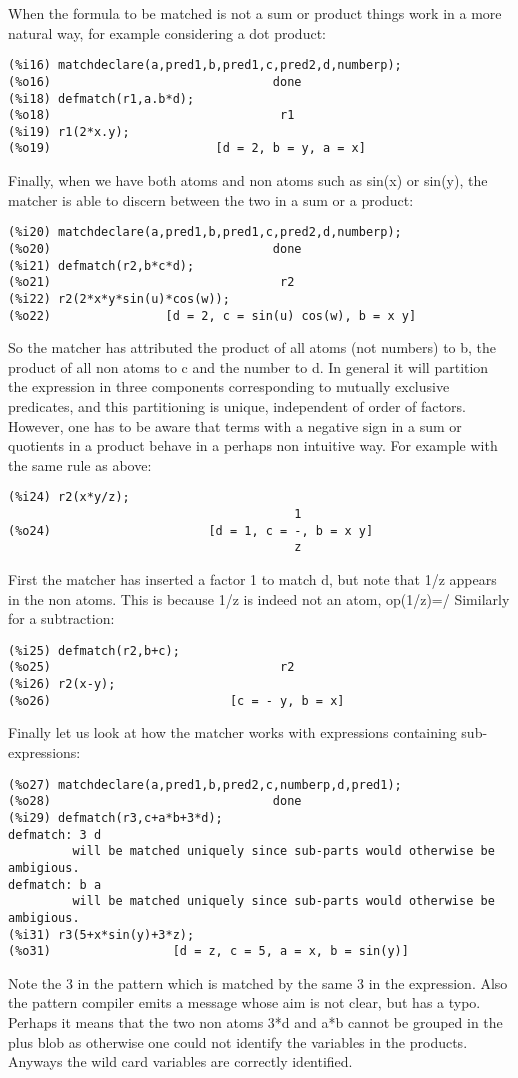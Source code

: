 \documentclass[a4paper,11pt]{article}
\begin{document}
When the formula to be matched is not a
sum or product things work in a more natural way, for example
considering a dot product:
\begin{verbatim}
(%i16) matchdeclare(a,pred1,b,pred1,c,pred2,d,numberp);
(%o16)                               done
(%i18) defmatch(r1,a.b*d);
(%o18)                                r1
(%i19) r1(2*x.y);
(%o19)                       [d = 2, b = y, a = x]
\end{verbatim}

Finally, when we have both atoms and non atoms such as sin(x) or sin(y),
the matcher is able to discern between the two in a sum or a product:
\begin{verbatim}
(%i20) matchdeclare(a,pred1,b,pred1,c,pred2,d,numberp);
(%o20)                               done
(%i21) defmatch(r2,b*c*d);
(%o21)                                r2
(%i22) r2(2*x*y*sin(u)*cos(w));
(%o22)                [d = 2, c = sin(u) cos(w), b = x y]
\end{verbatim}
So the matcher has attributed the product of all atoms (not numbers)
to b, the product of all non atoms to c and the number to d. In general
it will partition the expression in three components corresponding to
mutually exclusive predicates, and this partitioning is unique, 
independent of order of factors. However, one has to be aware that
terms with a negative sign in a sum or quotients in a product behave
in a perhaps non intuitive way. For example with the same rule as above:
\begin{verbatim}
(%i24) r2(x*y/z);
                                        1
(%o24)                      [d = 1, c = -, b = x y]
                                        z
\end{verbatim}
First the matcher has inserted a factor 1 to match d, but note that 1/z
appears in the non atoms. This is because 1/z is indeed not an atom, 
op(1/z)=/ Similarly for a subtraction:
\begin{verbatim}
(%i25) defmatch(r2,b+c);
(%o25)                                r2
(%i26) r2(x-y);
(%o26)                         [c = - y, b = x]
\end{verbatim}
Finally let us look at how the matcher works with expressions
containing sub-expressions:
\begin{verbatim}
(%o27) matchdeclare(a,pred1,b,pred2,c,numberp,d,pred1);
(%o28)                               done
(%i29) defmatch(r3,c+a*b+3*d);
defmatch: 3 d
         will be matched uniquely since sub-parts would otherwise be ambigious.
defmatch: b a
         will be matched uniquely since sub-parts would otherwise be ambigious.
(%i31) r3(5+x*sin(y)+3*z);
(%o31)                 [d = z, c = 5, a = x, b = sin(y)]
\end{verbatim}
Note the 3 in the pattern which is matched by the same 3 in the expression. Also
the pattern compiler emits a message whose aim is not clear, but has a typo.
Perhaps it means that the two non atoms 3*d and a*b cannot be grouped in the
plus blob as otherwise one could not identify the variables
in the products. Anyways the wild card variables are correctly identified.
\end{document}
